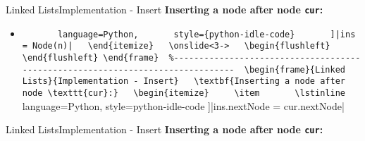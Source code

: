 
\begin{frame}{Linked Lists}{Implementation - Insert}
  \textbf{Inserting a node after node \texttt{cur}:}
  \begin{itemize}
    \item<2->
      \lstinline[
      language=Python,
      style={python-idle-code}
      ]|ins = Node(n)|
  \end{itemize}
  \onslide<3->
  \begin{flushleft}
    
  \end{flushleft}
\end{frame}


\begin{frame}{Linked Lists}{Implementation - Insert}
  \textbf{Inserting a node after node \texttt{cur}:}
  \begin{itemize}
    \item
      \lstinline[
        language=Python,
        style={python-idle-code}
      ]|ins.nextNode = cur.nextNode|
  \end{itemize}
  \begin{flushleft}
    
  \end{flushleft}
\end{frame}


\begin{frame}{Linked Lists}{Implementation - Insert}
  \textbf{Inserting a node after node \texttt{cur}:}
  \begin{flushleft}
    
  \end{flushleft}
\end{frame}



